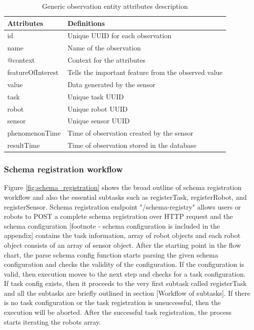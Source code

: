 	\begin{table}[!htbp]
		\begin{tabular}{|l|p{12cm}|}
			\hline
			\textbf{Attributes} & \textbf{Definitions} \\ \hline
			
				id & Unique UUID for each observation \\ \hline
				name & Name of the observation \\ \hline
				@context & Context for the attributes \\ \hline
				featureOfInterest & Tells the important feature from the observed value \\ \hline
				value & Data generated by the sensor \\ \hline
				task & Unique task UUID \\ \hline
				robot & Unique robot UUID \\ \hline
				sensor & Unique sensor UUID \\ \hline
				phenomenonTime & Time of observation created by the sensor \\ \hline
				resultTime & Time of observation stored in the database \\ \hline
			
		\end{tabular}
		\caption{Generic observation entity attributes description}
		\label{tab:observation}
	\end{table}

	\subsubsection{Schema registration workflow}
	Figure \ref{fig:schema_registration} shows the broad outline of schema registration workflow and also the essential subtasks such as registerTask,  registerRobot, and registerSensor. Schema registration endpoint "/schema-registry" allows users or robots to POST a complete schema registration over HTTP request and the schema configuration [footnote - schema configuration is included in the appendix] contains the task information, array of robot objects and each robot object consists of an array of sensor object. After the starting point in the flow chart, the parse schema config function starts parsing the given schema configuration and checks the validity of the configuration. If the configuration is valid, then execution moves to the next step and checks for a task configuration. If task config exists, then it proceeds to the very first subtask called registerTask and all the subtasks are briefly outlined in section [Workflow of subtasks]. If there is no task configuration or the task registration is unsuccessful, then the execution will be aborted.  After the successful task registration, the process starts iterating the robots array. 
	
